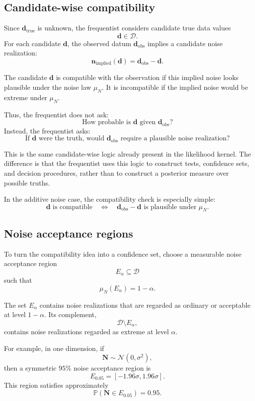 \documentclass[11pt]{article}
\newcommand{\Dspace}{\mathcal D}
\newcommand{\muN}{\mu_N}
\newcommand{\Nrand}{\mathbf N}
\newcommand{\dtrue}{\mathbf d_{\mathrm{true}}}
\newcommand{\dobs}{\mathbf d_{\mathrm{obs}}}
\newcommand{\Ealpha}{E_{\alpha}}
\newcommand{\Prob}{\mathbb P}
\begin{document}
\subsection{Candidate-wise compatibility}

Since \(\dtrue\) is unknown, the frequentist considers candidate true data values
\[
    \mathbf d\in\Dspace.
\]
For each candidate \(\mathbf d\), the observed datum \(\dobs\) implies a candidate noise realization:
\[
    \mathbf n_{\mathrm{implied}}(\mathbf d)
    =
    \dobs-\mathbf d.
\]

The candidate \(\mathbf d\) is compatible with the observation if this implied noise looks plausible under the noise law \(\muN\). It is incompatible if the implied noise would be extreme under \(\muN\).

Thus, the frequentist does not ask:
\[
    \text{How probable is } \mathbf d \text{ given } \dobs?
\]
Instead, the frequentist asks:
\[
    \text{If } \mathbf d \text{ were the truth, would } \dobs
    \text{ require a plausible noise realization?}
\]

This is the same candidate-wise logic already present in the likelihood kernel. The difference is that the frequentist uses this logic to construct tests, confidence sets, and decision procedures, rather than to construct a posterior measure over possible truths.

In the additive noise case, the compatibility check is especially simple:
\[
    \mathbf d
    \text{ is compatible}
    \quad
    \Longleftrightarrow
    \quad
    \dobs-\mathbf d
    \text{ is plausible under } \muN.
\]

\subsection{Noise acceptance regions}

To turn the compatibility idea into a confidence set, choose a measurable noise acceptance region
\[
    \Ealpha\subseteq\Dspace
\]
such that
\[
    \muN(\Ealpha)=1-\alpha.
\]

The set \(\Ealpha\) contains noise realizations that are regarded as ordinary or acceptable at level \(1-\alpha\). Its complement,
\[
    \Dspace\setminus\Ealpha,
\]
contains noise realizations regarded as extreme at level \(\alpha\).

For example, in one dimension, if
\[
    \Nrand\sim\mathcal N(0,\sigma^2),
\]
then a symmetric \(95\%\) noise acceptance region is
\[
    E_{0.05}
    =
    [-1.96\sigma,1.96\sigma].
\]
This region satisfies approximately
\[
    \Prob(\Nrand\in E_{0.05})=0.95.
\]
\end{document}
